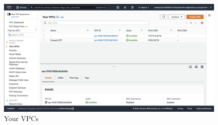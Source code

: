 \begin{figure}[H]
    \centering
        \includegraphics[width=\textwidth]{resources/your-vpcs.png}
    \caption{Your VPCs}
    \label{fig:your-vpcs}
\end{figure}